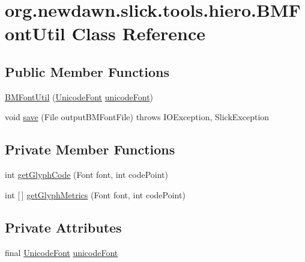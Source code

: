 \hypertarget{classorg_1_1newdawn_1_1slick_1_1tools_1_1hiero_1_1_b_m_font_util}{}\section{org.\+newdawn.\+slick.\+tools.\+hiero.\+B\+M\+Font\+Util Class Reference}
\label{classorg_1_1newdawn_1_1slick_1_1tools_1_1hiero_1_1_b_m_font_util}
\subsection*{Public Member Functions}
\begin{DoxyCompactItemize}
\item 
\mbox{\hyperlink{classorg_1_1newdawn_1_1slick_1_1tools_1_1hiero_1_1_b_m_font_util_a45430a25f08c0391ab82920875ae6c4f}{B\+M\+Font\+Util}} (\mbox{\hyperlink{classorg_1_1newdawn_1_1slick_1_1_unicode_font}{Unicode\+Font}} \mbox{\hyperlink{classorg_1_1newdawn_1_1slick_1_1tools_1_1hiero_1_1_b_m_font_util_aabb529febc55852008fc0d4436186dd3}{unicode\+Font}})
\item 
void \mbox{\hyperlink{classorg_1_1newdawn_1_1slick_1_1tools_1_1hiero_1_1_b_m_font_util_afe5a8f63efd3b23cf7542e8ca94a6bb9}{save}} (File output\+B\+M\+Font\+File)  throws I\+O\+Exception, Slick\+Exception 
\end{DoxyCompactItemize}
\subsection*{Private Member Functions}
\begin{DoxyCompactItemize}
\item 
int \mbox{\hyperlink{classorg_1_1newdawn_1_1slick_1_1tools_1_1hiero_1_1_b_m_font_util_a698b237c62793730ef53730c52a5ae97}{get\+Glyph\+Code}} (Font font, int code\+Point)
\item 
int \mbox{[}$\,$\mbox{]} \mbox{\hyperlink{classorg_1_1newdawn_1_1slick_1_1tools_1_1hiero_1_1_b_m_font_util_a103b65a81fd522188bc0fd1401fd13f5}{get\+Glyph\+Metrics}} (Font font, int code\+Point)
\end{DoxyCompactItemize}
\subsection*{Private Attributes}
\begin{DoxyCompactItemize}
\item 
final \mbox{\hyperlink{classorg_1_1newdawn_1_1slick_1_1_unicode_font}{Unicode\+Font}} \mbox{\hyperlink{classorg_1_1newdawn_1_1slick_1_1tools_1_1hiero_1_1_b_m_font_util_aabb529febc55852008fc0d4436186dd3}{unicode\+Font}}
\end{DoxyCompactItemize}



